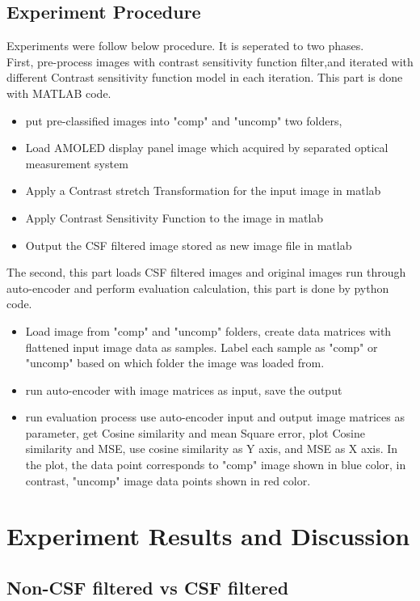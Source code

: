 \documentclass{article}
\begin{document}
\subsection{Experiment Procedure}
Experiments were follow below procedure. It is seperated to two phases.\\
First, pre-process images with contrast sensitivity function filter,and iterated with different Contrast sensitivity function model in each iteration. This part is done with MATLAB code.
\begin{itemize}
    \item put pre-classified images into "comp" and "uncomp" two folders,
    \item Load AMOLED display panel image which acquired by separated optical measurement system
    \item Apply a Contrast stretch Transformation for the input image in matlab
    \item Apply Contrast Sensitivity Function to the image in matlab
    \item Output the CSF filtered image stored as new image file in matlab
\end{itemize}
The second, this part loads CSF filtered images and original images run through auto-encoder and perform evaluation calculation, this part is done by python code.
\begin{itemize}
    \item Load image from "comp" and "uncomp" folders, create data matrices with flattened input image data as samples. Label each sample as "comp" or "uncomp" based on which folder the image was loaded from.
    \item run auto-encoder with image matrices as input, save the output
    \item run evaluation process use auto-encoder input and output image matrices as parameter, get Cosine similarity and mean Square error, plot Cosine similarity and MSE, use cosine similarity as Y axis, and MSE as X axis. In the plot, the data point corresponds to "comp" image shown in blue color, in contrast, "uncomp" image data points shown in red color.
\end{itemize}

\section{Experiment Results and Discussion}
\subsection{Non-CSF filtered vs CSF filtered}
\end{document}
